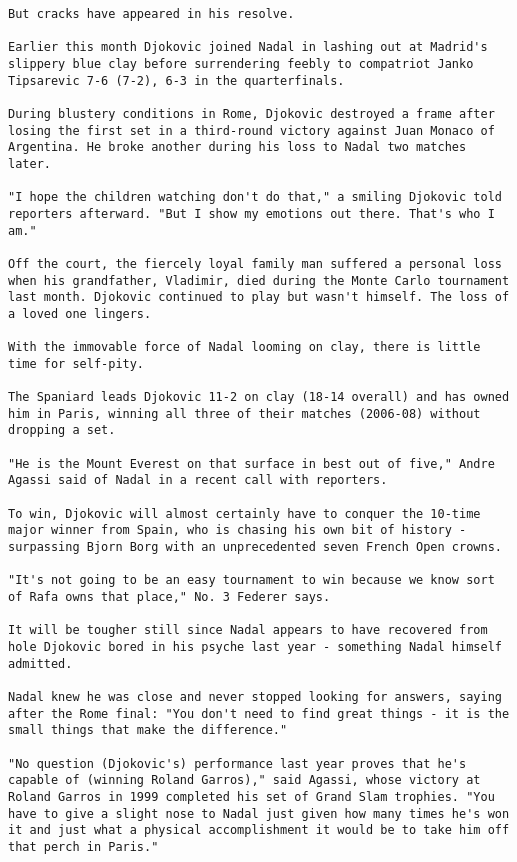 \begin{lstlisting}
But cracks have appeared in his resolve.

Earlier this month Djokovic joined Nadal in lashing out at Madrid's slippery blue clay before surrendering feebly to compatriot Janko Tipsarevic 7-6 (7-2), 6-3 in the quarterfinals.

During blustery conditions in Rome, Djokovic destroyed a frame after losing the first set in a third-round victory against Juan Monaco of Argentina. He broke another during his loss to Nadal two matches later.

"I hope the children watching don't do that," a smiling Djokovic told reporters afterward. "But I show my emotions out there. That's who I am."

Off the court, the fiercely loyal family man suffered a personal loss when his grandfather, Vladimir, died during the Monte Carlo tournament last month. Djokovic continued to play but wasn't himself. The loss of a loved one lingers.

With the immovable force of Nadal looming on clay, there is little time for self-pity.

The Spaniard leads Djokovic 11-2 on clay (18-14 overall) and has owned him in Paris, winning all three of their matches (2006-08) without dropping a set.

"He is the Mount Everest on that surface in best out of five," Andre Agassi said of Nadal in a recent call with reporters.

To win, Djokovic will almost certainly have to conquer the 10-time major winner from Spain, who is chasing his own bit of history - surpassing Bjorn Borg with an unprecedented seven French Open crowns.

"It's not going to be an easy tournament to win because we know sort of Rafa owns that place," No. 3 Federer says.

It will be tougher still since Nadal appears to have recovered from hole Djokovic bored in his psyche last year - something Nadal himself admitted.

Nadal knew he was close and never stopped looking for answers, saying after the Rome final: "You don't need to find great things - it is the small things that make the difference."

"No question (Djokovic's) performance last year proves that he's capable of (winning Roland Garros)," said Agassi, whose victory at Roland Garros in 1999 completed his set of Grand Slam trophies. "You have to give a slight nose to Nadal just given how many times he's won it and just what a physical accomplishment it would be to take him off that perch in Paris."


\end{lstlisting}
